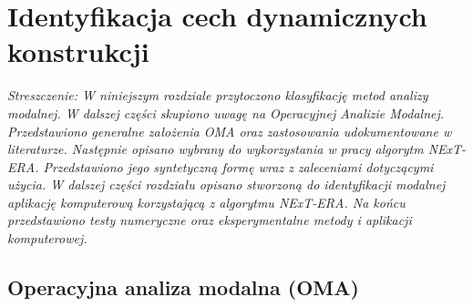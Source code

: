 \chapter{Identyfikacja cech dynamicznych konstrukcji}

\textit{Streszczenie: W niniejszym rozdziale przytoczono klasyfikację metod analizy modalnej. W dalszej części skupiono uwagę na Operacyjnej Analizie Modalnej. Przedstawiono generalne założenia OMA oraz zastosowania udokumentowane w literaturze. Następnie opisano wybrany do wykorzystania w pracy algorytm NExT-ERA. Przedstawiono jego syntetyczną formę wraz z zaleceniami dotyczącymi użycia. W dalszej części rozdziału opisano stworzoną do identyfikacji modalnej aplikację komputerową korzystającą z algorytmu NExT-ERA. Na końcu przedstawiono testy numeryczne oraz eksperymentalne metody i aplikacji komputerowej.}


\section{Operacyjna analiza modalna (OMA)}
